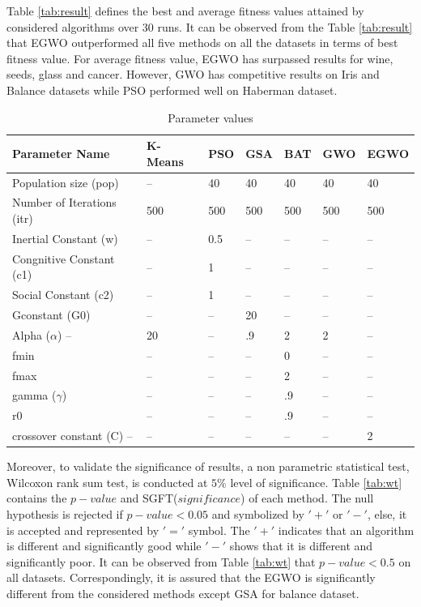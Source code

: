 \documentclass[review]{elsarticle}
\begin{document}
  Table \ref{tab:result} defines the best and average fitness values attained by considered algorithms over 30 runs. It can be observed from the Table \ref{tab:result} that EGWO outperformed all five methods on all the datasets in terms of best fitness value. For average fitness value, EGWO has surpassed results for wine, seeds, glass and cancer. However, GWO has competitive results on Iris and Balance datasets while PSO performed well on Haberman dataset.
\begin{table}
\caption{Parameter values}
\scriptsize
\begin{center}
\renewcommand{\arraystretch}{0.7}
  \begin{tabular}{l l l l l l l}
    \hline
    \hline
\textbf{Parameter Name} & \textbf{K-Means} &\textbf{PSO} &\textbf{GSA} &\textbf{BAT}& \textbf{GWO} &\textbf{EGWO}\\
\hline
Population size (pop)	&	--& 40	&	40 &	40	&	40	&40\\
Number of Iterations (itr) &	500	&	500 &	500	&	500 & 500 & 500\\
Inertial Constant (w)	&	--& 0.5& --&	--	&	--&--	\\
Congnitive Constant (c1)	&	--& 1 & --&	--	&	--&--	\\
Social Constant (c2)	&--& 1 & --&	--	&	--&--\\
Gconstant (G0)&--& --& 20 & --&	--&--\\
Alpha ($\alpha$) --& 20& --&	.9 & 2&2 &--\\
fmin	&	--& --& --& 0	&	--&--\\
fmax	&	--& --& --&	2	&	--&--	\\
gamma ($\gamma$)& --& --& --&	.9	&	--&--	\\
r0	& --& --& --&	.9	&	--&--\\
crossover constant (C)  --& --& --& --&	--&--& 2 \\
    \hline
  \end{tabular}
\end{center}
\label{tab:Param}
\end{table}
   Moreover, to validate the significance of results, a non parametric statistical test, Wilcoxon rank sum test, is conducted at $5\%$ level of significance. Table \ref{tab:wt} contains the $p-value$ and SGFT($significance$) of each method. The null hypothesis is rejected if $p-value<0.05$ and symbolized by $'+'$ or $'-'$, else, it is accepted and represented by $'='$ symbol. The $'+'$ indicates that an algorithm is different and significantly good while $'-'$ shows that it is different and significantly poor. It can be observed from Table \ref{tab:wt} that $p-value<0.5$ on all datasets. Correspondingly, it is assured that the EGWO  is significantly different from the considered methods except GSA for balance dataset. \\
\end{document}
